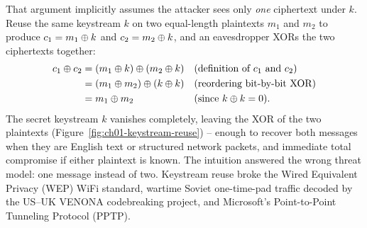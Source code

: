 That argument implicitly assumes the attacker sees only \emph{one} ciphertext under $k$. Reuse the same keystream $k$ on two equal-length plaintexts $m_1$ and $m_2$ to produce $c_1 = m_1 \oplus k$ and $c_2 = m_2 \oplus k$, and an eavesdropper XORs the two ciphertexts together:
\begin{align*}
c_1 \oplus c_2
  &= (m_1 \oplus k) \oplus (m_2 \oplus k) &&\text{(definition of $c_1$ and $c_2$)} \\
  &= (m_1 \oplus m_2) \oplus (k \oplus k) &&\text{(reordering bit-by-bit XOR)} \\
  &= m_1 \oplus m_2 &&\text{(since $k \oplus k = 0$)}.
\end{align*}
The secret keystream $k$ vanishes completely, leaving the XOR of the two plaintexts (Figure~\ref{fig:ch01-keystream-reuse}) -- enough to recover both messages when they are English text or structured network packets, and immediate total compromise if either plaintext is known. The intuition answered the wrong threat model: one message instead of two. Keystream reuse broke the Wired Equivalent Privacy (WEP) WiFi standard, wartime Soviet one-time-pad traffic decoded by the US--UK VENONA codebreaking project, and Microsoft's Point-to-Point Tunneling Protocol (PPTP).

